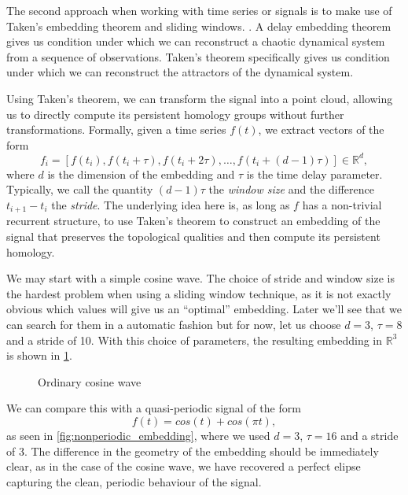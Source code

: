 The second approach when working with time series or signals is to make use of Taken's embedding theorem and sliding windows. \cite{takens2006detecting}. A delay embedding theorem gives us condition under which we can reconstruct a chaotic dynamical system from a sequence of observations. Taken's theorem specifically gives us condition under which we can reconstruct the attractors of the dynamical system.

Using Taken's theorem, we can transform the signal into a point cloud, allowing us to directly compute its persistent homology groups without further transformations. Formally, given a time series $f(t)$, we extract vectors of the form
\begin{equation*}
f_{i} = [f(t_{i}), f(t_{i} + \tau), f(t_{i} + 2\tau), \ldots, f(t_{i} + (d-1)\tau)] \in \mathbb{R}^{d},
\end{equation*}
where $d$ is the dimension of the embedding and $\tau$ is the time delay parameter. Typically, we call the quantity $(d-1)\tau$ the \textit{window size} and the difference $t_{i+1} - t_{i}$ the \textit{stride}. The underlying idea here is, as long as $f$ has a non-trivial recurrent structure, to use Taken's theorem to construct an embedding of the signal that preserves the topological qualities and then compute its persistent homology.

We may start with a simple cosine wave. The choice of stride and window size is the hardest problem when using a sliding window technique, as it is not exactly obvious which values will give us an ``optimal'' embedding. Later we'll see that we can search for them in a automatic fashion but for now, let us choose $d=3$, $\tau=8$ and a stride of 10. With this choice of parameters, the resulting embedding in $\mathbb{R}^{3}$ is shown in \ref{fig:cosine_embedding}.

\begin{figure}[h!]
    \centering
    \qquad
    \caption{Ordinary cosine wave}%
    \label{fig:cosine_embedding}%
\end{figure}

We can compare this with a quasi-periodic signal of the form
\begin{equation*}
  f(t) = cos(t) + cos(\pi t),
\end{equation*}
as seen in \ref{fig:nonperiodic_embedding}, where we used $d=3$, $\tau=16$ and a stride of 3. The difference in the geometry of the embedding should be immediately clear, as in the case of the cosine wave, we have recovered a perfect elipse capturing the clean, periodic behaviour of the signal.

